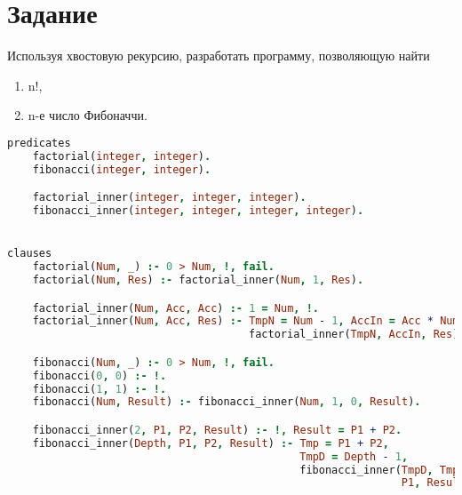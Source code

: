 \section*{Задание}

Используя хвостовую рекурсию, разработать программу, позволяющую найти

\begin{enumerate}
    \item n!,
    \item n-е число Фибоначчи.
\end{enumerate}

\begin{lstlisting}[language=Prolog]
predicates
    factorial(integer, integer).
    fibonacci(integer, integer).

    factorial_inner(integer, integer, integer).
    fibonacci_inner(integer, integer, integer, integer).


clauses
    factorial(Num, _) :- 0 > Num, !, fail.
    factorial(Num, Res) :- factorial_inner(Num, 1, Res).

    factorial_inner(Num, Acc, Acc) :- 1 = Num, !.
    factorial_inner(Num, Acc, Res) :- TmpN = Num - 1, AccIn = Acc * Num,
                                      factorial_inner(TmpN, AccIn, Res).

    fibonacci(Num, _) :- 0 > Num, !, fail.
    fibonacci(0, 0) :- !.
    fibonacci(1, 1) :- !.
    fibonacci(Num, Result) :- fibonacci_inner(Num, 1, 0, Result).

    fibonacci_inner(2, P1, P2, Result) :- !, Result = P1 + P2.
    fibonacci_inner(Depth, P1, P2, Result) :- Tmp = P1 + P2,
                                              TmpD = Depth - 1,
                                              fibonacci_inner(TmpD, Tmp,
                                                              P1, Result).
\end{lstlisting}


